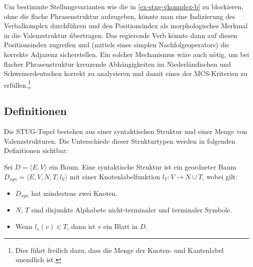 Um bestimmte Stellungsvarianten wie die in \ref{ex-stug-vkomplex-b} zu blockieren, ohne die flache Phrasenstruktur aufzugeben, könnte man eine Indizierung des Verbalkomplex durchführen und den Positionsindex als morphologisches Merkmal in die Valenzstruktur übertragen. Das regierende Verb könnte dann auf diesen Positionsindex zugreifen und (mittels eines simplen Nachfolgeoperators) die korrekte Adjazenz sicherstellen. Ein solcher Mechanismus wäre auch nötig, um bei flacher Phrasenstruktur kreuzende Abhängigkeiten im Niederländischen und Schweizerdeutschen korrekt zu analysieren und damit eines der MCS-Kriterien zu erfüllen.\footnote{Dies führt freilich dazu, dass die Menge der Knoten- und Kantenlabel unendlich ist.}


\subsection{Definitionen}

Die STUG-Tupel bestehen aus einer syntaktischen Struktur und einer Menge von Valenzstrukturen. Die Unterschiede dieser Strukturtypen werden in folgenden Definitionen sichtbar:

\begin{definition} Sei $D = \langle E,V \rangle$ ein Baum. Eine syntaktische Struktur ist ein geordneter Baum $D_{\mathit{syn}} = \langle E,V,N,T,l_V \rangle$ mit einer Knotenlabelfunktion $l_V: V \to N\cup T$, wobei gilt:
\begin{itemize}
  \item $D_{\mathit{syn}}$ hat mindestens zwei Knoten.
  \item $N$, $T$ sind disjunkte Alphabete nicht-terminaler und terminaler Symbole.
  \item Wenn $l_v(v) \in T$, dann ist $v$ ein Blatt in $D$.
\end{itemize} 
\end{definition}

